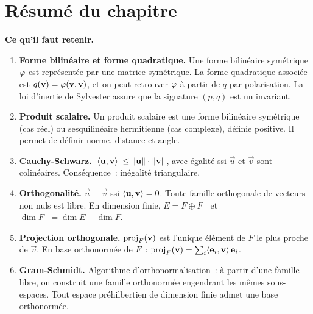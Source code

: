 \section*{Résumé du chapitre}

\begin{framed}
\textbf{Ce qu'il faut retenir.}

\begin{enumerate}[label=\textbf{\arabic*.},leftmargin=2em]
  \item \textbf{Forme bilinéaire et forme quadratique.} Une forme
    bilinéaire symétrique $\varphi$ est représentée par une matrice
    symétrique. La forme quadratique associée est
    $q(\mathbf{v})=\varphi(\mathbf{v},\mathbf{v})$, et on peut retrouver $\varphi$
    à partir de $q$ par polarisation. La loi d'inertie de Sylvester
    assure que la signature $(p,q)$ est un invariant.

  \item \textbf{Produit scalaire.} Un produit scalaire est une forme
    bilinéaire symétrique (cas réel) ou sesquilinéaire hermitienne
    (cas complexe), définie positive. Il permet de définir norme,
    distance et angle.

  \item \textbf{Cauchy-Schwarz.}
    $\lvert\langle\mathbf{u},\mathbf{v}\rangle\rvert
    \leq\lVert\mathbf{u}\rVert\cdot\lVert\mathbf{v}\rVert$, avec égalité ssi
    $\vec{u}$ et $\vec{v}$ sont colinéaires. Conséquence~: inégalité
    triangulaire.

  \item \textbf{Orthogonalité.} $\vec{u}\perp\vec{v}$ ssi
    $\langle\mathbf{u},\mathbf{v}\rangle=0$. Toute famille orthogonale de vecteurs
    non nuls est libre. En dimension finie, $E=F\oplus F^\perp$ et
    $\dim F^\perp=\dim E-\dim F$.

  \item \textbf{Projection orthogonale.} $\operatorname{proj}_F(\mathbf{v})$ est l'unique
    élément de $F$ le plus proche de $\vec{v}$. En base orthonormée
    de $F$~:
    $\operatorname{proj}_F(\mathbf{v})=\sum_i\langle\mathbf{e}_{i},\mathbf{v}\rangle\,\mathbf{e}_{i}$.

  \item \textbf{Gram-Schmidt.} Algorithme d'orthonormalisation~: à
    partir d'une famille libre, on construit une famille orthonormée
    engendrant les mêmes sous-espaces. Tout espace préhilbertien de
    dimension finie admet une base orthonormée.


\end{enumerate}
\end{framed}
